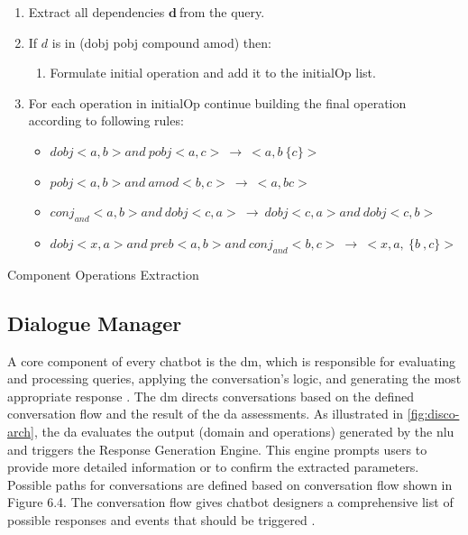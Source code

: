 \setlength{\algomargin}{2em} %
\begin{algorithm}
	\DontPrintSemicolon
	
	\begin{enumerate}
	\def\labelenumi{\arabic{enumi}.}
	\item
	  Extract all dependencies \(\mathbf{d\ }\)from the query.
	\item
  If \(d\) is in (dobj \textbar{} pobj \textbar{} compound
  \textbar{} amod) then:
  	\begin{enumerate}
  	  \def\labelenumii{\alph{enumii}.}
  	  \item
  	    Formulate initial operation and add it to the initialOp list.
  	  \end{enumerate}
  \item
    For each operation in initialOp continue building the final operation
    according to following rules:
    \begin{itemize}
    \item
      \(dobj < a,b > and\ pobj < a,c > \  \rightarrow \  < a,b\ \{ c\} >\)
    \item
      \(pobj < a,b > and\ amod < b,c > \  \rightarrow \  < a,bc >\)
    \item
      \(conj_{and} < a,b > and\ dobj < c,a > \  \rightarrow \ dobj < c,a > and\ dobj < c,b >\)
    \item
      \(dobj < x,a > and\ preb < a,b > and\ conj_{and} < b,c > \  \rightarrow \  < x,a,\ \{ b\ ,c\} >\)
    \end{itemize}
	\end{enumerate}
	
\caption{Component Operations Extraction}\label{alg:disc-op-extraction}
\end{algorithm}

\vspace{-10pt}
\hypertarget{sec:dialogue-manager}{%
\subsection{Dialogue Manager}\label{sec:dialogue-manager}}
\vspace{10pt} 	
A core component of every chatbot is the \gls{dm}, which is
responsible for evaluating and processing queries, applying the
conversation's logic, and generating the most
appropriate response \autocite{Raghuvanshi2018}. The \gls{dm} directs
conversations based on the defined conversation flow and the result of
the \gls{da} assessments. As illustrated in
\cref{fig:disco-arch}, the \gls{da} evaluates the output (domain and operations)
generated by the \gls{nlu} and triggers the Response Generation Engine. This
engine prompts users to provide more detailed information or to confirm
the extracted parameters. Possible paths for conversations are defined
based on conversation flow shown in Figure 6.4. The conversation flow
gives chatbot designers a comprehensive list of possible responses and
events that should be triggered \autocite{Candello2017}.


